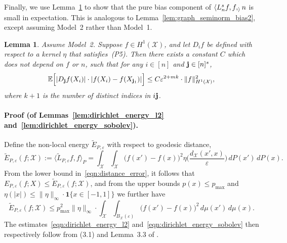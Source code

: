 \documentclass[aos]{imsart}
\theoremstyle{plain}
\newtheorem{lemma}{Lemma}
\theoremstyle{definition}
\theoremstyle{remark}
\newcommand{\Ebb}{\mathbb{E}}
\newcommand{\dotp}[2]{\langle #1, #2 \rangle}
\newcommand{\wt}[1]{\widetilde{#1}}
\newcommand{\mc}[1]{\mathcal{#1}}
\newcommand{\1}{\mathbf{1}}
\newcommand{\bj}{{\bf j}}
\begin{document}
Finally, we use Lemma~\ref{lem:manifold_graph_seminorm_bias2} to show that the pure bias component of $\dotp{L_n^sf,f}_n$ is small in expectation. This is analogous to Lemma~\ref{lem:graph_seminorm_bias2}, except assuming Model~2 rather than Model~1.
\begin{lemma}
	\label{lem:manifold_graph_seminorm_bias2}
	Assume Model~2. Suppose $f \in H^1(\mc{X})$, and let $D_if$ be defined with respect to a kernel $\eta$ that satisfies~(P5). Then there exists a constant $C$ which does not depend on $f$ or $n$, such that for any $i \in [n]$ and $\bj \in [n]^s$,
	\begin{equation*}
	\Ebb\Bigl[|D_{\bj}f(X_i)| \cdot |f(X_i) - f(X_{\bj_1})|\Bigr] \leq C \varepsilon^{2 + mk} \cdot \|f\|_{H^1(\mc{X})}^2,
	\end{equation*}
	where $k + 1$ is the number of distinct indices in $i\bj$. 
\end{lemma}

\paragraph{Proof (of Lemmas~\ref{lem:dirichlet_energy_l2} and~\ref{lem:dirichlet_energy_sobolev}).}
Define the non-local energy $\wt{E}_{P,\varepsilon}$ with respect to geodesic distance,
\begin{equation*}
\wt{E}_{P,\varepsilon}(f;{\mc{X}}) := \dotp{\wt{L}_{P,\varepsilon}f}{f}_{P} = \int_{\mc{X}} \int_{\mc{X}} \bigl(f(x') - f(x)\bigr)^2 \eta\biggl(\frac{d_{\mc{X}}(x',x)}{\varepsilon}\biggr) \,dP(x') \,dP(x).
\end{equation*}
From the lower bound in~\eqref{eqn:distance_error}, it follows that $E_{P,\varepsilon}(f;X) \leq \wt{E}_{P,\varepsilon}(f;{\mc{X}})$, and from the upper bounds $p(x) \leq p_{\max}$ and $\eta(|x|) \leq \|\eta\|_{\infty} \cdot \1\{x \in [-1,1]\}$ we further have
\begin{equation*}
\wt{E}_{P,\varepsilon}(f;{\mc{X}}) \leq p_{\max}^2 \|\eta\|_{\infty} \cdot \int_{\mc{X}} \int_{B_{\mc{X}}(\varepsilon)} \bigl(f(x') - f(x)\bigr)^2 \,d\mu(x') \,d\mu(x).
\end{equation*}
The estimates~\eqref{eqn:dirichlet_energy_l2} and~\eqref{eqn:dirichlet_energy_sobolev} then respectively follow from (3.1) and Lemma~3.3 of \cite{burago2014}.
\end{document}

